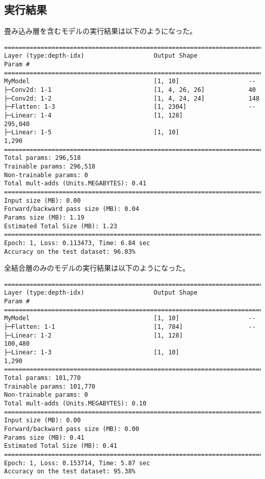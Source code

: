 \documentclass{ltjsarticle}
\begin{document}
    \subsection{実行結果}
        畳み込み層を含むモデルの実行結果は以下のようになった。
        \begin{lstlisting}
==================================================================================
Layer (type:depth-idx)                   Output Shape              Param #
==================================================================================
MyModel                                  [1, 10]                   --
├─Conv2d: 1-1                            [1, 4, 26, 26]            40
├─Conv2d: 1-2                            [1, 4, 24, 24]            148
├─Flatten: 1-3                           [1, 2304]                 --
├─Linear: 1-4                            [1, 128]                  295,040
├─Linear: 1-5                            [1, 10]                   1,290
==================================================================================
Total params: 296,518
Trainable params: 296,518
Non-trainable params: 0
Total mult-adds (Units.MEGABYTES): 0.41
==================================================================================
Input size (MB): 0.00
Forward/backward pass size (MB): 0.04
Params size (MB): 1.19
Estimated Total Size (MB): 1.23
==================================================================================
Epoch: 1, Loss: 0.113473, Time: 6.84 sec
Accuracy on the test dataset: 96.03%
        \end{lstlisting}

        全結合層のみのモデルの実行結果は以下のようになった。
        \begin{lstlisting}
==================================================================================
Layer (type:depth-idx)                   Output Shape              Param #
==================================================================================
MyModel                                  [1, 10]                   --
├─Flatten: 1-1                           [1, 784]                  --
├─Linear: 1-2                            [1, 128]                  100,480
├─Linear: 1-3                            [1, 10]                   1,290
==================================================================================
Total params: 101,770
Trainable params: 101,770
Non-trainable params: 0
Total mult-adds (Units.MEGABYTES): 0.10
==================================================================================
Input size (MB): 0.00
Forward/backward pass size (MB): 0.00
Params size (MB): 0.41
Estimated Total Size (MB): 0.41
==================================================================================
Epoch: 1, Loss: 0.153714, Time: 5.87 sec
Accuracy on the test dataset: 95.38%
        \end{lstlisting}
\end{document}
